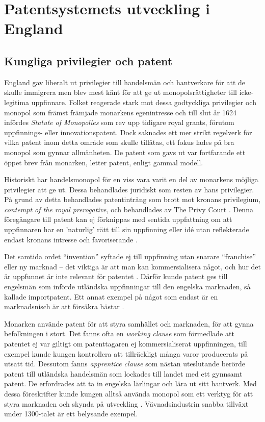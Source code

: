 \section{Patentsystemets utveckling i England} 
\label{sec:eng}

\subsection{Kungliga privilegier och patent} 

England gav liberalt ut privilegier till handelsmän och hantverkare för att de skulle immigrera men blev
mest känt för att ge ut monopolsrättigheter till icke-legitima uppfinnare. Folket reagerade stark mot
dessa godtyckliga privilegier och monopol som främst främjade monarkens egenintresse och till slut år 1624 infördes
\emph{Statute of Monopolies} som rev upp tidigare royal grants, förutom uppfinnings- eller innovationspatent.
Dock saknades ett mer strikt regelverk för vilka patent inom detta område som skulle tillåtas, ett fokus
lades på bra monopol som gynnar allmänheten. De patent som gavs ut var fortfarande ett öppet brev från
monarken, letter patent, enligt gammal modell.

Historiskt har handelsmonopol för en viss vara 
varit en del av monarkens möjliga privilegier att ge ut. Dessa behandlades
juridiskt som resten av hans privilegier. På grund av detta behandlades patentintrång som brott mot kronans privilegium, \emph{contempt of the royal prerogative}, och behandlades av The Privy Court \cite{macleod}. Denna
föregångare till patent kan ej förknippas med sentida uppfattning om att uppfinnaren har en 'naturlig' rätt till sin uppfinning eller idé
utan reflekterade endast kronans intresse och favoriserande \cite{bracha}.

Det samtida ordet ``invention'' syftade ej till uppfinning utan snarare ``franchise'' eller ny marknad -- det
viktiga är att man kan kommersialisera något, och hur det är uppfunnet är inte relevant för patentet \cite{bracha}.
Därför kunde patent ges till engelsmän som införde utländska uppfinningar till den engelska marknaden, så kallade importpatent.
Ett annat exempel på något som endast är en marknadsnisch är att försäkra hästar \cite{davies}.



Monarken använde patent för att styra samhället och marknaden, för att gynna befolkningen i stort. Det fanns ofta en \emph{working clause} som förmedlade att patentet ej var
giltigt om patenttagaren ej kommersialiserat uppfinningen, till exempel kunde kungen kontrollera att
tillräckligt många varor producerats på utsatt tid. Dessutom fanns \emph{apprentice clause} som nästan
uteslutande berörde patent till utländska handelsmän som lockades till landet med ett gynnsamt patent. De erfordrades att ta in engelska lärlingar och
lära ut sitt hantverk. Med dessa föreskrifter kunde kungen alltså använda monopol som ett verktyg för att styra marknaden och skynda på utveckling \cite{bracha}.
Vävnadsindustrin snabba tillväxt under 1300-talet är ett belysande exempel\cite{klitzike}.


